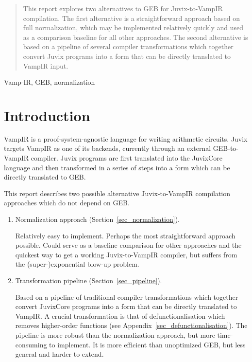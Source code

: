 



\begin{abstract}
  This report explores two alternatives to GEB for Juvix-to-VampIR
  compilation. The first alternative is a straightforward approach
  based on full normalization, which may be implemented relatively
  quickly and used as a comparison baseline for all other
  approaches. The second alternative is based on a pipeline of several
  compiler transformations which together convert Juvix programs into 
  a form that can be directly translated to VampIR input.
\end{abstract}

\begin{keywords}
Vamp-IR, GEB, normalization
\end{keywords}
\maketitle

\section{Introduction}\label{sec_introduction}

VampIR is a proof-system-agnostic language for writing arithmetic
circuits. Juvix targets VampIR as one of its backends, currently
through an external GEB-to-VampIR compiler. Juvix programs are first
translated into the JuvixCore language and then transformed in a
series of steps into a form which can be directly translated to GEB.

This report describes two possible alternative Juvix-to-VampIR
compilation approaches which do not depend on GEB.
\begin{enumerate}
\item Normalization approach (Section~\ref{sec_normalization}).

   Relatively easy to implement. Perhaps the most straightforward
   approach possible. Could serve as a baseline comparison for other
   approaches and the quickest way to get a working Juvix-to-VampIR
   compiler, but suffers from the (super-)exponential blow-up problem.
\item Transformation pipeline (Section~\ref{sec_pipeline}).

  Based on a pipeline of traditional compiler transformations which
  together convert JuvixCore programs into a form that can be directly
  translated to VampIR. A crucial transformation is that of
  defunctionalisation which removes higher-order functions (see
  Appendix~\ref{sec_defunctionalisation}). The pipeline is more robust
  than the normalization approach, but more time-consuming to
  implement. It is more efficient than unoptimized GEB, but less
  general and harder to extend.
\end{enumerate}

